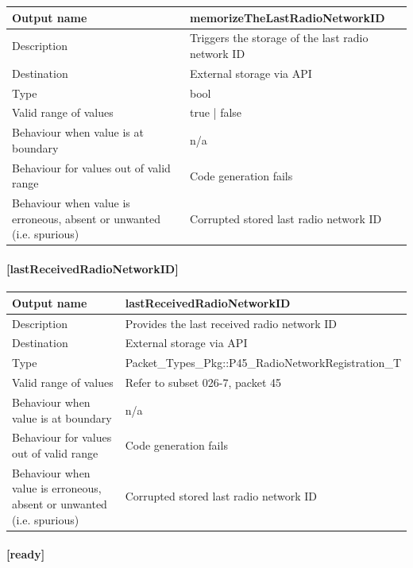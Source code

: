 \begin{longtable}{p{}p{}}
	\toprule
	Output name				& memorizeTheLastRadioNetworkID \\
	\midrule
	Description				& Triggers the storage of the last radio network ID \\
	\midrule
	Destination				& External storage via API \\ 
	\midrule
	Type					& bool \\
	\midrule
	Valid range of values	& true | false \\
	\midrule
	Behaviour when value is at boundary	& n/a \\
	\midrule
	Behaviour for values out of valid range	& Code generation fails \\
	\midrule
	Behaviour when value is erroneous, absent or unwanted (i.e. spurious) & Corrupted stored last radio network ID \\
	\bottomrule
\end{longtable}


\paragraph{[lastReceivedRadioNetworkID]}

\begin{longtable}{p{}p{}}
	\toprule
	Output name				& lastReceivedRadioNetworkID \\
	\midrule
	Description				& Provides the last received radio network ID \\
	\midrule
	Destination				& External storage via API \\ 
	\midrule
	Type					& Packet\_Types\_Pkg::P45\_RadioNetworkRegistration\_T \\
	\midrule
	Valid range of values	& Refer to subset 026-7, packet 45 \\
	\midrule
	Behaviour when value is at boundary	& n/a \\
	\midrule
	Behaviour for values out of valid range	& Code generation fails \\
	\midrule
	Behaviour when value is erroneous, absent or unwanted (i.e. spurious) & Corrupted stored last radio network ID \\
	\bottomrule
\end{longtable}

\paragraph{[ready]}

